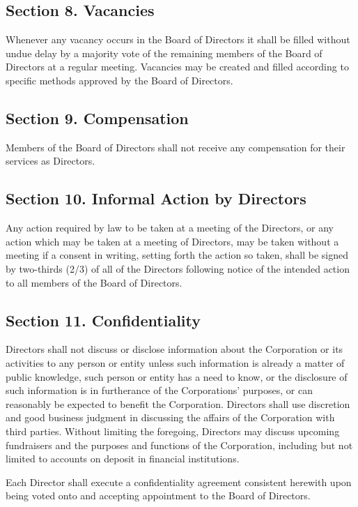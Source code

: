\documentclass[a4paper]{article}
\begin{document}
\subsection*{Section 8. Vacancies}

Whenever any vacancy occurs in the Board of Directors it shall be filled without undue delay by a majority vote of the remaining members of the Board of Directors at a regular meeting.  Vacancies may be created and filled according to specific methods approved by the Board of Directors.

\subsection*{Section 9. Compensation}

Members of the Board of Directors shall not receive any compensation for their services as Directors.

\subsection*{Section 10. Informal Action by Directors}

Any action required by law to be taken at a meeting of the Directors, or any action which may be taken at a meeting of Directors, may be taken without a meeting if a consent in writing, setting forth the action so taken, shall be signed by two-thirds (2/3) of all of the Directors following notice of the intended action to all members of the Board of Directors.

\subsection*{Section 11. Confidentiality}

Directors shall not discuss or disclose information about the Corporation or its activities to any person or entity unless such information is already a matter of public knowledge, such person or entity has a need to know, or the disclosure of such information is in furtherance of the Corporations' purposes, or can reasonably be expected to benefit the Corporation.  Directors shall use discretion and good business judgment in discussing the affairs of the Corporation with third parties.  Without limiting the foregoing, Directors may discuss upcoming fundraisers and the purposes and functions of the Corporation, including but not limited to accounts on deposit in financial institutions.

Each Director shall execute a confidentiality agreement consistent herewith upon being voted onto and accepting appointment to the Board of Directors.
\end{document}
